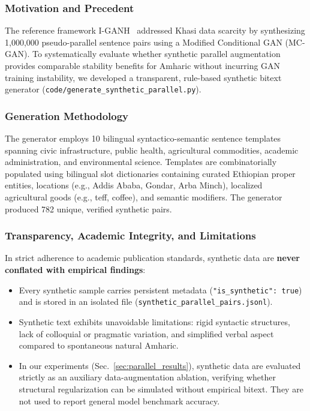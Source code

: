 \documentclass[11pt,a4paper]{article}
\begin{document}
\subsubsection{Motivation and Precedent}
The reference framework I-GANH~\cite{Syiemlieh2026} addressed Khasi data
scarcity by synthesizing 1,000,000 pseudo-parallel sentence pairs using a
Modified Conditional GAN (MC-GAN).  To systematically evaluate whether
synthetic parallel augmentation provides comparable stability benefits for
Amharic without incurring GAN training instability, we developed a
transparent, rule-based synthetic bitext generator
(\texttt{code/generate\_synthetic\_parallel.py}).

\subsubsection{Generation Methodology}
The generator employs 10 bilingual syntactico-semantic sentence templates
spanning civic infrastructure, public health, agricultural commodities,
academic administration, and environmental science.  Templates are
combinatorially populated using bilingual slot dictionaries containing
curated Ethiopian proper entities, locations (e.g., Addis Ababa, Gondar,
Arba Minch), localized agricultural goods (e.g., teff, coffee), and
semantic modifiers.  The generator produced 782 unique, verified synthetic
pairs.

\subsubsection{Transparency, Academic Integrity, and Limitations}
In strict adherence to academic publication standards, synthetic data are
\textbf{never conflated with empirical findings}:
\begin{itemize}
  \item Every synthetic sample carries persistent metadata
        (\texttt{"is\_synthetic": true}) and is stored in an isolated
        file (\texttt{synthetic\_parallel\_pairs.jsonl}).
  \item Synthetic text exhibits unavoidable limitations: rigid syntactic
        structures, lack of colloquial or pragmatic variation, and
        simplified verbal aspect compared to spontaneous natural Amharic.
  \item In our experiments (Sec.~\ref{sec:parallel_results}), synthetic
        data are evaluated strictly as an auxiliary data-augmentation
        ablation, verifying whether structural regularization can be
        simulated without empirical bitext.  They are not used to report
        general model benchmark accuracy.
\end{itemize}
\end{document}
